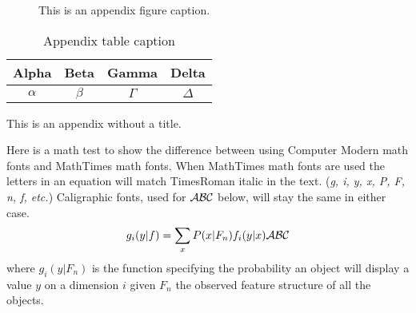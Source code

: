 \documentclass{wileySix}
\begin{document}
\begin{figure}[ht]
\caption{This is an appendix figure caption.}
\end{figure}


\begin{table}[ht]
\caption{Appendix table caption}
\centering
\begin{tabular}{cccc}
\hline
Alpha&Beta&Gamma&Delta\\
\hline
$\alpha$&$\beta$&$\Gamma$&$\Delta$\\
\hline
\end{tabular}
\end{table}


\appendix{}
This is an appendix without a title.

Here is a math test to show the difference between using Computer Modern
math fonts and MathTimes math fonts. When MathTimes math fonts are used
the letters in an equation will match TimesRoman italic in the text.
({\it g, i, y, x, P, F, n, f, etc.}) Caligraphic fonts, used for
$\cal ABC$ below, will stay the same
in either case.
\begin{equation}
g_i(y|f)=\sum_x P(x|F_n)f_i(y|x){\cal ABC}
\end{equation}
where $g_i(y|F_n)$ is the function specifying the probability an object will
display a value $y$ on a dimension $i$ given $F_n$ the observed feature
structure of all the objects.







\printindex


\end{document}
